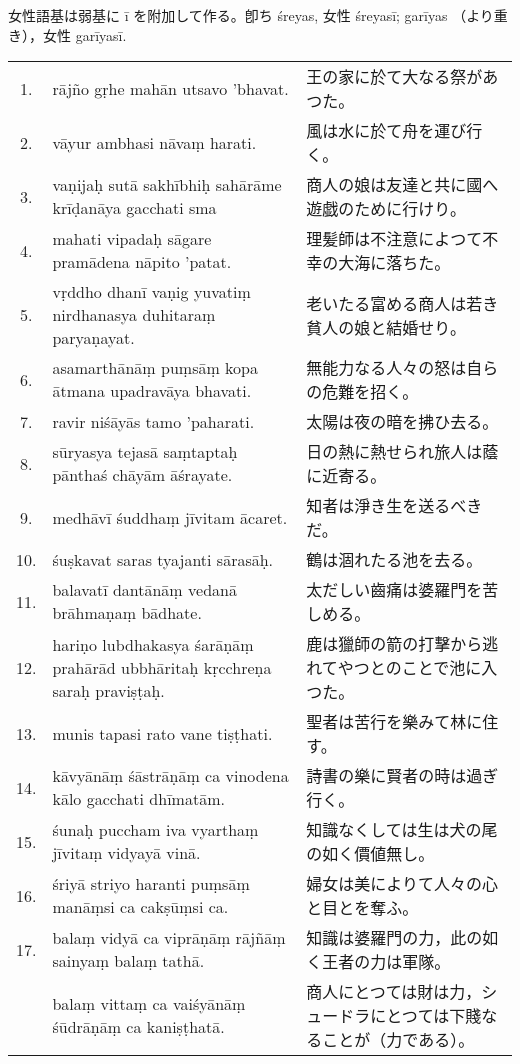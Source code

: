 女性語基は弱基に ī を附加して作る。卽ち śreyas, 女性
śreyasī; garīyas （より重き），女性 garīyasī.

\begin{longtable}{c*{2}{p{0.45\hsize}}}
 1. & rājño gṛhe mahān utsavo 'bhavat. & 王の家に於て大なる祭があつた。\\
 2. & vāyur ambhasi nāvaṃ ha\-rati. & 風は水に於て舟を運び行く。\\
 3. & vaṇijaḥ sutā sakhībhiḥ sa\-hārāme krīḍanāya gacchati sma & 商人の娘は友達と共に國へ遊戯のために行けり。\\
 4. & mahati vipadaḥ sāgare pra\-mādena nāpito 'patat. & 理髪師は不注意によつて不幸の大海に落ちた。\\
 5. & vṛddho dhanī vaṇig yuvatiṃ nirdhanasya duhitaraṃ parya\-ṇayat. & 老いたる富める商人は若き貧人の娘と結婚せり。\\
 6. & asamarthānāṃ puṃsāṃ kopa ātmana upadravāya bhavati. & 無能力なる人々の怒は自らの危難を招く。\\
 7. & ravir niśāyās tamo 'paharati. & 太陽は夜の暗を拂ひ去る。\\
 8. & sūryasya tejasā saṃtaptaḥ pānthaś chāyām āśrayate. & 日の熱に熱せられ旅人は蔭に近寄る。\\
 9. & medhāvī śuddhaṃ jīvitam ācaret. & 知者は淨き生を送るべきだ。\\
10. & śuṣkavat saras tyajanti sā\-rasāḥ. & 鶴は涸れたる池を去る。\\
11. & balavatī dantānāṃ vedanā brāhmaṇaṃ bādhate. & 太だしい齒痛は婆羅門を苦しめる。\\
12. & hariṇo lubdhakasya śarāṇāṃ prahārād ubbhāritaḥ kṛcchreṇa saraḥ praviṣṭaḥ. & 鹿は獵師の箭の打擊から逃
れてやつとのことで池に入つた。\\
13. & munis tapasi rato vane tiṣṭhati. & 聖者は苦行を樂みて林に住す。\\
14. & kāvyānāṃ śāstrāṇāṃ ca vino\-dena kālo gacchati dhīmatām. & 詩書の樂に賢者の時は過ぎ行く。\\
15. & śunaḥ puccham iva vyarthaṃ jīvitaṃ vidyayā vinā. & 知識なくしては生は犬の尾の如く價値無し。\\
16. & śriyā striyo haranti puṃsāṃ manāṃsi ca cakṣūṃsi ca. & 婦女は美によりて人々の心と目とを奪ふ。\\
17. & balaṃ vidyā ca viprāṇāṃ rājñāṃ sainyaṃ balaṃ tathā. &知識は婆羅門の力，此の如く王者の力は軍隊。\\
& balaṃ vittaṃ ca vaiśyānāṃ śūdrāṇāṃ ca kaniṣṭhatā. & 商人にとつては財は力，シュードラにとつては下賤な
ることが（力である）。
\end{longtable}

